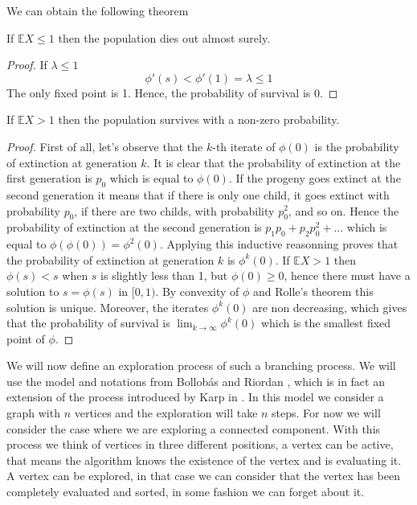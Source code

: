 We can obtain the following theorem
\begin{theorem}
	If $\mathbb{E}X \leq 1$ then the population dies out almost surely.
\end{theorem}
\begin{proof}
    If $\lambda \leq 1$
	\begin{equation}
	    \phi'(s) < \phi'(1) = \lambda \leq 1
	\end{equation}
	The only fixed point is 1. Hence, the probability of survival is 0.
\end{proof}
\begin{theorem}
	If $\mathbb{E}X > 1$ then the population survives with a non-zero probability.
\end{theorem}
\begin{proof}
	First of all, let's observe that the $k$-th iterate of $\phi(0)$ is the probability of extinction at generation $k$.
	It is clear that the probability of extinction at the first generation is $p_0$ which is equal to $\phi(0)$.
	If the progeny goes extinct at the second generation it means that if there is only one child, it goes extinct with probability $p_0$, if there are two childs, with probability $p_0^2$, and so on.
	Hence the probability of extinction at the second generation is $p_1 p_0 + p_2 p_0^2 + \ldots$ which is equal to $\phi(\phi(0)) = \phi^2(0)$.
	Applying this inductive reasonning proves that the probability of extinction at generation $k$ is $\phi^k(0)$.
	\newline
	If $\mathbb{E}X > 1$ then $\phi(s) < s$ when $s$ is slightly less than 1, but $\phi(0) \geq 0$, hence there must have a solution to $s = \phi(s)$ in $[0,1)$.
	By convexity of $\phi$ and Rolle's theorem this solution is unique.
	Moreover, the iterates $\phi^k(0)$ are non decreasing, which gives that the probability of survival is $\lim_{k \to \infty} \phi^k(0)$ which is the smallest fixed point of $\phi$.
\end{proof}
We will now define an exploration process of such a branching process. We will use the model and notations from Bollob\'as and Riordan \cite{BollobRiordan12}, which is in fact an extension of the process introduced by Karp in \cite{Karp90}.
In this model we consider a graph with $n$ vertices and the exploration will take $n$ steps. 
For now we will consider the case where we are exploring a connected component.
With this process we think of vertices in three different positions, a vertex can be active, that means the algorithm knows the existence of the vertex and is evaluating it.
A vertex can be explored, in that case we can consider that the vertex has been completely evaluated and sorted, in some fashion we can forget about it.
